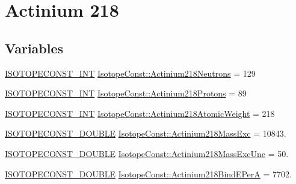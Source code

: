 \hypertarget{group___isotope_const-_actinium-_ac218}{}\section{Actinium 218}
\label{group___isotope_const-_actinium-_ac218}
\subsection*{Variables}
\begin{DoxyCompactItemize}
\item 
\mbox{\hyperlink{group___isotope_const-_macros_ga5f18360b3e99483a35c32d789e62621c}{I\+S\+O\+T\+O\+P\+E\+C\+O\+N\+S\+T\+\_\+\+I\+NT}} \mbox{\hyperlink{group___isotope_const-_actinium-_ac218_ga8d9a5c3894c9650814e77bcba70816be}{Isotope\+Const\+::\+Actinium218\+Neutrons}} = 129
\item 
\mbox{\hyperlink{group___isotope_const-_macros_ga5f18360b3e99483a35c32d789e62621c}{I\+S\+O\+T\+O\+P\+E\+C\+O\+N\+S\+T\+\_\+\+I\+NT}} \mbox{\hyperlink{group___isotope_const-_actinium-_ac218_gad48ef6a7b206af6766dbf7d88c45e786}{Isotope\+Const\+::\+Actinium218\+Protons}} = 89
\item 
\mbox{\hyperlink{group___isotope_const-_macros_ga5f18360b3e99483a35c32d789e62621c}{I\+S\+O\+T\+O\+P\+E\+C\+O\+N\+S\+T\+\_\+\+I\+NT}} \mbox{\hyperlink{group___isotope_const-_actinium-_ac218_gadd5dbfc8a9d0bf2a834fada140a498de}{Isotope\+Const\+::\+Actinium218\+Atomic\+Weight}} = 218
\item 
\mbox{\hyperlink{group___isotope_const-_macros_ga8f45a7272ce02c0b4c65c44636ed719a}{I\+S\+O\+T\+O\+P\+E\+C\+O\+N\+S\+T\+\_\+\+D\+O\+U\+B\+LE}} \mbox{\hyperlink{group___isotope_const-_actinium-_ac218_ga9a8242b8b02f1b5e25f50dece44a22cb}{Isotope\+Const\+::\+Actinium218\+Mass\+Exc}} = 10843.
\item 
\mbox{\hyperlink{group___isotope_const-_macros_ga8f45a7272ce02c0b4c65c44636ed719a}{I\+S\+O\+T\+O\+P\+E\+C\+O\+N\+S\+T\+\_\+\+D\+O\+U\+B\+LE}} \mbox{\hyperlink{group___isotope_const-_actinium-_ac218_gaa62e529c8bf9f1cfbf7fcdf8fe9df350}{Isotope\+Const\+::\+Actinium218\+Mass\+Exc\+Unc}} = 50.
\item 
\mbox{\hyperlink{group___isotope_const-_macros_ga8f45a7272ce02c0b4c65c44636ed719a}{I\+S\+O\+T\+O\+P\+E\+C\+O\+N\+S\+T\+\_\+\+D\+O\+U\+B\+LE}} \mbox{\hyperlink{group___isotope_const-_actinium-_ac218_gaa62145bc657203293fc74966b32c1ed6}{Isotope\+Const\+::\+Actinium218\+Bind\+E\+PerA}} = 7702.
\item 

\end{DoxyCompactItemize}
